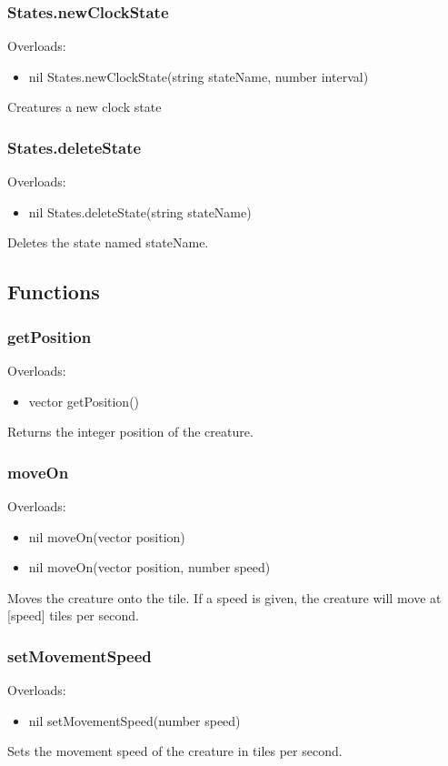 \documentclass{book}
\newenvironment{ulist}
	{\begin{itemize}
			\itemsep0em}
	{\end{itemize}}
\begin{document}
\subsubsection{States.newClockState}
Overloads:
\begin{ulist}
	\item nil States.newClockState(string stateName, number interval)
\end{ulist}
Creatures a new clock state

\subsubsection{States.deleteState}
Overloads:
\begin{ulist}
	\item nil States.deleteState(string stateName)
\end{ulist}
Deletes the state named stateName.


\subsection{Functions}
\subsubsection{getPosition}
Overloads:
\begin{ulist}
	\item vector getPosition()
\end{ulist}
Returns the integer position of the creature.

\subsubsection{moveOn}
Overloads:
\begin{ulist}
	\item nil moveOn(vector position)
	\item nil moveOn(vector position, number speed)
\end{ulist}
Moves the creature onto the tile. If a speed is given, the creature will move at [speed] tiles per second.

\subsubsection{setMovementSpeed}
Overloads:
\begin{ulist}
	\item nil setMovementSpeed(number speed)
\end{ulist}
Sets the movement speed of the creature in tiles per second.
\end{document}

